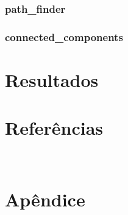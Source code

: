 \documentclass[a4paper,11pt]{article}
\begin{document}
    \subsubsection{path\_finder}
    
    \subsubsection{connected\_components}

    
    \section{Resultados}\label{sec:resultados}

    \clearpage


    \section{Referências}\label{sec:referencias}~\nocite{aed,cpp}
    \printbibliography[
        heading=none,
    ]

    \clearpage


    \section{Apêndice}\label{sec:apendice}
    
\end{document}
